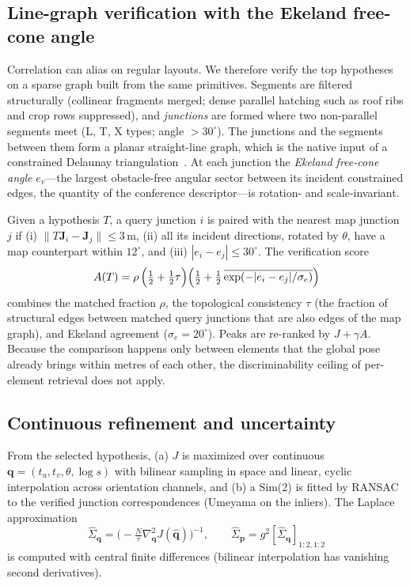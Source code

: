\subsection{Line-graph verification with the Ekeland free-cone angle}
\label{sec:verify}
Correlation can alias on regular layouts. We therefore verify the top
hypotheses on a sparse graph built from the same primitives. Segments are
filtered structurally (collinear fragments merged; dense parallel hatching such
as roof ribs and crop rows suppressed), and \emph{junctions} are formed where
two non-parallel segments meet (L, T, X types; angle $>30^\circ$). The junctions
and the segments between them form a planar straight-line graph, which is the
native input of a constrained Delaunay triangulation~\cite{shewchuk1996triangle}.
At each junction the \emph{Ekeland free-cone angle} $e_v$---the largest
obstacle-free angular sector between its incident constrained edges, the
quantity of the conference descriptor---is rotation- and scale-invariant.

Given a hypothesis $T$, a query junction $i$ is paired with the nearest map
junction $j$ if (i) $\|T\mathbf J_i-\mathbf J_j\|\le3$\,m, (ii) all its incident
directions, rotated by $\theta$, have a map counterpart within $12^\circ$, and
(iii) $|e_i-e_j|\le30^\circ$. The verification score
\begin{equation}
 A(T)=\rho\,\Bigl(\tfrac12+\tfrac12\tau\Bigr)\Bigl(\tfrac12+\tfrac12\,\overline{\exp(-|e_i-e_j|/\sigma_e)}\Bigr)
\end{equation}
combines the matched fraction $\rho$, the topological consistency $\tau$ (the
fraction of structural edges between matched query junctions that are also
edges of the map graph), and Ekeland agreement ($\sigma_e=20^\circ$). Peaks
are re-ranked by $J+\gamma A$. Because the comparison happens only between
elements that the global pose already brings within metres of each other, the
discriminability ceiling of per-element retrieval does not apply.

\subsection{Continuous refinement and uncertainty}
\label{sec:refine}
From the selected hypothesis, (a) $J$ is maximized over continuous
$\mathbf q=(t_u,t_v,\theta,\log s)$ with bilinear sampling in space and linear,
cyclic interpolation across orientation channels, and (b) a Sim(2) is fitted
by RANSAC~\cite{fischler1981ransac} to the verified junction correspondences
(Umeyama on the inliers). The Laplace approximation
\begin{equation}
 \hat\Sigma_{\mathbf q}=\bigl(-\tfrac{N}{\tau}\nabla^2_{\mathbf q}J(\hat{\mathbf q})\bigr)^{-1},\qquad
 \hat\Sigma_{\mathbf p}=g^2[\hat\Sigma_{\mathbf q}]_{1:2,1:2}
 \label{eq:laplace}
\end{equation}
is computed with central finite differences (bilinear interpolation has
vanishing second derivatives).

